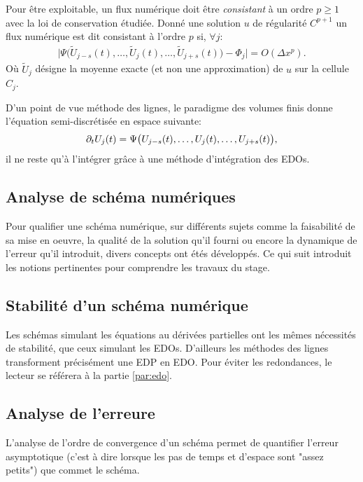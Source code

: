     \begin{definition}
        Pour être exploitable, un flux numérique doit être \textit{consistant} à un ordre $p\geq 1$ avec la loi de conservation étudiée.
        Donné une solution $u$ de régularité $C^{p+1}$ un flux numérique est dit consistant à l'ordre $p$ si, $\forall j$:
        \begin{align}
            \vert \Psi \bigl( \tilde U_{j-s}(t) , \ldots ,\tilde  U_j(t), \ldots ,  \tilde U_{j+s}(t)\bigr) -  \Phi_j \vert = O(\Delta x^p).
        \end{align}
        Où $\tilde U_j$ désigne la moyenne exacte (et non une approximation) de $u$ sur la cellule $C_j$.
    \end{definition}
    D'un point de vue méthode des lignes, le paradigme des volumes finis donne l'équation semi-discrétisée en espace suivante:
    \begin{align}
        \partial_t U_j(t) = \Psi \bigl( U_{j-s}(t) , \ldots , U_j(t), \ldots ,  U_{j+s}(t)\bigr),
    \end{align}
    il ne reste qu'à l'intégrer grâce à une méthode d'intégration des EDOs.


\subsection{Analyse de schéma numériques}
    Pour qualifier une schéma numérique, sur différents sujets comme 
    la faisabilité de sa mise en oeuvre, la qualité de la solution qu'il fourni ou encore la dynamique de l'erreur qu'il introduit, 
    divers concepts ont étés développés. Ce qui suit introduit les notions pertinentes pour comprendre les travaux du stage. 

    \subsection{Stabilité d'un schéma numérique}
        Les schémas simulant les équations au dérivées partielles ont les mêmes nécessités de stabilité, que ceux simulant les EDOs. 
        D'ailleurs les méthodes des lignes transforment précisément une EDP en EDO. 
        Pour éviter les redondances, le lecteur se référera à la partie \ref{par:edo}.
    \subsection{Analyse de l'erreure}
        L'analyse de l'ordre de convergence d'un schéma permet de quantifier l'erreur asymptotique 
        (c'est à dire lorsque les pas de temps et d'espace sont "assez petits") que commet le schéma.
